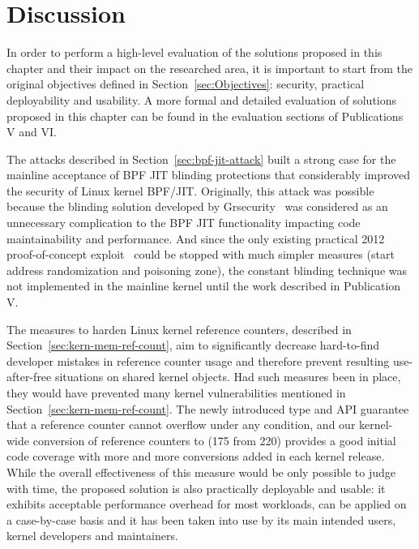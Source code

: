 \section{Discussion}

In order to perform a high-level evaluation of the solutions proposed in this chapter and their impact on the researched area, it is important to start from the original objectives defined in Section~\ref{sec:Objectives}: security, practical deployability and usability. A more formal and detailed evaluation of solutions proposed in this chapter can be found in the evaluation sections of Publications V and VI. 

The attacks described in Section~\ref{sec:bpf-jit-attack} built a strong case for the mainline acceptance of BPF JIT blinding protections that considerably improved the security of Linux kernel BPF/JIT. Originally, this attack was possible because the blinding solution developed by Grsecurity~\cite{grsecurity} was considered as an unnecessary complication to the BPF JIT functionality impacting code maintainability and performance. And since the only existing practical 2012 proof-of-concept exploit~\cite{mcallister2012attacking} could be stopped with much simpler measures (start address randomization and poisoning zone), the constant blinding technique was not implemented in the mainline kernel until the work described in Publication V. 

The measures to harden Linux kernel reference counters, described in Section~\ref{sec:kern-mem-ref-count}, aim to significantly decrease hard-to-find developer mistakes in reference counter usage and therefore prevent resulting use-after-free situations on shared kernel objects. Had such measures been in place, they would have prevented many kernel vulnerabilities mentioned in Section~\ref{sec:kern-mem-ref-count}. The newly introduced  type and API guarantee that a reference counter cannot overflow under any condition, and our kernel-wide conversion of reference counters to  (175 from 220) provides a good initial code coverage with more and more conversions added in each kernel release. While the overall effectiveness of this measure would be only possible to judge with time, the proposed solution is also practically deployable and usable: it exhibits acceptable performance overhead for most workloads, can be applied on a case-by-case basis and it has been taken into use by its main intended users, kernel developers and maintainers. 

